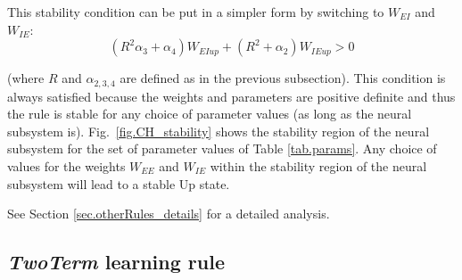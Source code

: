 \documentclass[twocolumn]{article}
\newcommand{\EE}{\mathit{EE}}
\newcommand{\EI}{\mathit{EI}}
\newcommand{\IE}{\mathit{IE}}
\newcommand{\up}{\mathit{up}}
\begin{document}
This stability condition can be put in a simpler form by switching to $W_{\EI}$ and $W_{\IE}$:
\begin{equation}
(R^2 \alpha_3 + \alpha_4) W_{\EI\up} + (R^2 + \alpha_2) W_{\IE\up} > 0
\label{eq.CH_stable_cond_v2}
\end{equation}

\noindent (where $R$ and $\alpha_{2,3,4}$ are defined as in the previous subsection). This condition is always satisfied because the weights and parameters are positive definite and thus the rule is stable for any choice of parameter values (as long as the neural subsystem is). Fig.\ \ref{fig.CH_stability} shows the stability region of the neural subsystem for the set of parameter values of Table \ref{tab.params}. Any choice of values for the weights $W_{\EE}$ and $W_{\IE}$ within the stability region of the neural subsystem will lead to a stable Up state.

See Section \ref{sec.otherRules_details} for a detailed analysis.



\subsection{{\em TwoTerm} learning rule}
\end{document}
